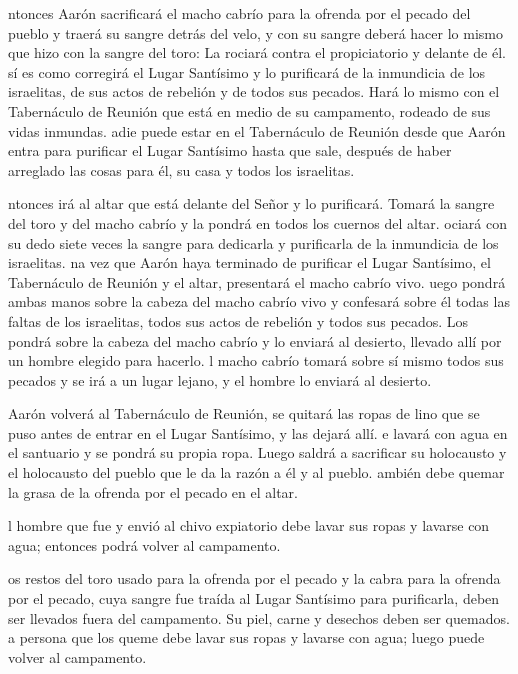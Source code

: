  ntonces Aarón sacrificará el macho cabrío para la ofrenda
por el pecado del pueblo y traerá su sangre detrás del velo, y con su
sangre deberá hacer lo mismo que hizo con la sangre del toro: La rociará
contra el propiciatorio y delante de él.  sí es como
corregirá el Lugar Santísimo y lo purificará de la inmundicia de los
israelitas, de sus actos de rebelión y de todos sus pecados. Hará lo
mismo con el Tabernáculo de Reunión que está en medio de su campamento,
rodeado de sus vidas inmundas.  adie puede estar en el
Tabernáculo de Reunión desde que Aarón entra para purificar el Lugar
Santísimo hasta que sale, después de haber arreglado las cosas para él,
su casa y todos los israelitas.

 ntonces irá al altar que está delante del Señor y lo
purificará. Tomará la sangre del toro y del macho cabrío y la pondrá en
todos los cuernos del altar.  ociará con su dedo siete
veces la sangre para dedicarla y purificarla de la inmundicia de los
israelitas.  na vez que Aarón haya terminado de purificar
el Lugar Santísimo, el Tabernáculo de Reunión y el altar, presentará el
macho cabrío vivo.  uego pondrá ambas manos sobre la cabeza
del macho cabrío vivo y confesará sobre él todas las faltas de los
israelitas, todos sus actos de rebelión y todos sus pecados. Los pondrá
sobre la cabeza del macho cabrío y lo enviará al desierto, llevado allí
por un hombre elegido para hacerlo.  l macho cabrío tomará
sobre sí mismo todos sus pecados y se irá a un lugar lejano, y el hombre
lo enviará al desierto.

 Aarón volverá al Tabernáculo de Reunión, se quitará las
ropas de lino que se puso antes de entrar en el Lugar Santísimo, y las
dejará allí.  e lavará con agua en el santuario y se pondrá
su propia ropa. Luego saldrá a sacrificar su holocausto y el holocausto
del pueblo que le da la razón a él y al pueblo.  ambién
debe quemar la grasa de la ofrenda por el pecado en el altar.

 l hombre que fue y envió al chivo expiatorio debe lavar
sus ropas y lavarse con agua; entonces podrá volver al campamento.

 os restos del toro usado para la ofrenda por el pecado y
la cabra para la ofrenda por el pecado, cuya sangre fue traída al Lugar
Santísimo para purificarla, deben ser llevados fuera del campamento. Su
piel, carne y desechos deben ser quemados.  a persona que
los queme debe lavar sus ropas y lavarse con agua; luego puede volver al
campamento.

